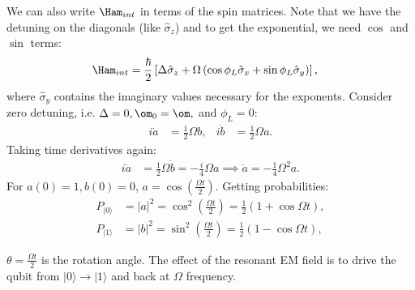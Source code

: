 \documentclass[a4paper, 11pt, normalem]{report}
\begin{document}
We can also write $\Ham_{int}$ in terms of the spin matrices.
Note that we have the detuning on the diagonals (like $\hat{\sigma}_z$) and to get the exponential, we need $\cos$ and $\sin$ terms:
\begin{align}
    \Ham_{int} &= \frac{\hbar}{2}\left[\Delta\hat{\sigma}_z + \Omega\left(\cos\phi_L\hat{\sigma}_x + \sin\phi_L\hat{\sigma}_y\right)\right],
\end{align}
where $\hat{\sigma}_y$ contains the imaginary values necessary for the exponents.
Consider zero detuning, i.e. $\Delta=0,\om_0=\om,$ and $\phi_L=0$:
\begin{align}
    i\dot{a} &= \frac12 \Omega b, & i\dot{b} &= \frac12\Omega a.
\end{align}
Taking time derivatives again:
\begin{align}
    i\ddot{a} &= \frac12\Omega\dot{b} = -\frac{i}{4}\Omega a \implies \ddot{a} = -\frac14\Omega^2 a.
\end{align}
For $a(0)=1,b(0)=0$, $a=\cos\left(\frac{\Omega t}{2}\right)$.
Getting probabilities:
\begin{align}
    P_{|0\rangle} &= |a|^2 = \cos^2\left(\frac{\Omega t}{2}\right) = \frac12(1+\cos\Omega t), \\
    P_{|1\rangle} &= |b|^2 = \sin^2\left(\frac{\Omega t}{2}\right) = \frac12(1-\cos\Omega t),
\end{align}
\begin{figure}[H]
    \centering
\end{figure}
$\theta=\frac{\Omega t}{2}$ is the rotation angle.
The effect of the resonant EM field is to drive the qubit from $|0\rangle\to|1\rangle$ and back at $\Omega$ frequency.
\end{document}
